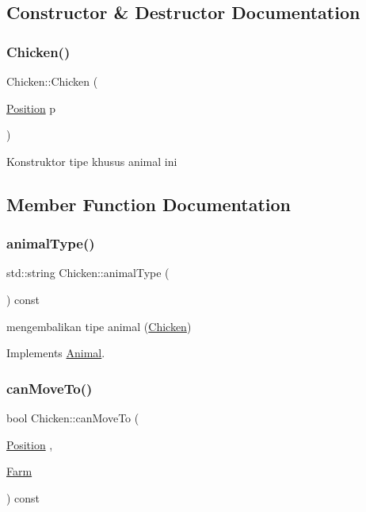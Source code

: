\subsection{Constructor \& Destructor Documentation}
\mbox{\label{class_chicken_a4f02c9fb941a36cfec565dc0b198ab3c}} 
\subsubsection{\texorpdfstring{Chicken()}{Chicken()}}
{\footnotesize\ttfamily Chicken\+::\+Chicken (\begin{DoxyParamCaption}\item[{\mbox{\hyperlink{class_position}{Position}}}]{p }\end{DoxyParamCaption})}

Konstruktor tipe khusus animal ini 

\subsection{Member Function Documentation}
\mbox{\label{class_chicken_a95e129b0b1230bd548eba900852e4810}} 
\subsubsection{\texorpdfstring{animalType()}{animalType()}}
{\footnotesize\ttfamily std\+::string Chicken\+::animal\+Type (\begin{DoxyParamCaption}{ }\end{DoxyParamCaption}) const\hspace{0.3cm}{\ttfamily [virtual]}}

mengembalikan tipe animal (\mbox{\hyperlink{class_chicken}{Chicken}}) 

Implements \mbox{\hyperlink{class_animal_a1969cf8cf77a7900207420ae26f856e9}{Animal}}.

\mbox{\label{class_chicken_acfb2980acf752d7004675083b9475c28}} 
\subsubsection{\texorpdfstring{canMoveTo()}{canMoveTo()}}
{\footnotesize\ttfamily bool Chicken\+::can\+Move\+To (\begin{DoxyParamCaption}\item[{\mbox{\hyperlink{class_position}{Position}}}]{,  }\item[{\mbox{\hyperlink{class_farm}{Farm}}}]{ }\end{DoxyParamCaption}) const\hspace{0.3cm}{\ttfamily [virtual]}}

